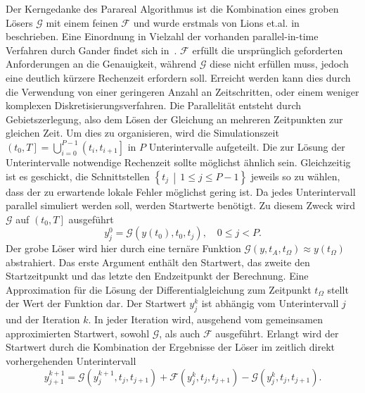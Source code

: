 Der Kerngedanke des Parareal Algorithmus ist die Kombination eines groben Lösers \(\mathcal{G}\) mit einem feinen \(\mathcal{F}\) und wurde erstmals von Lions et.al. in~\cite{Lions:2001} beschrieben. Eine Einordnung in Vielzahl der vorhanden parallel-in-time Verfahren durch Gander findet sich in~\cite{Gander:2015}. \(\mathcal{F}\) erfüllt die ursprünglich geforderten Anforderungen an die Genauigkeit, während \(\mathcal{G}\) diese nicht erfüllen muss, jedoch eine deutlich kürzere Rechenzeit erfordern soll. Erreicht werden kann dies durch die Verwendung von einer geringeren Anzahl an Zeitschritten, oder einem weniger komplexen Diskretisierungsverfahren. Die Parallelität entsteht durch Gebietszerlegung, also dem Lösen der Gleichung an mehreren Zeitpunkten zur gleichen Zeit. Um dies zu organisieren, wird die Simulationszeit \(\left(t_0, T\right] = \bigcup_{i=0}^{P-1} \left(t_i, t_{i+1}\right]\) in \(P\) Unterintervalle aufgeteilt. Die zur Lösung der Unterintervalle notwendige Rechenzeit sollte möglichst ähnlich sein. Gleichzeitig ist es geschickt, die Schnittstellen \(\left\{t_j \,\middle|\, 1 \leq j \leq P-1\right\}\) jeweils so zu wählen, dass der zu erwartende lokale Fehler möglichst gering ist. Da jedes Unterintervall parallel simuliert werden soll, werden Startwerte benötigt. Zu diesem Zweck wird \(\mathcal{G}\) auf \(\left(t_0, T\right]\) ausgeführt
\begin{displaymath}
    y_{j}^{0} = \mathcal{G}\!\left(y(t_0), t_0, t_{j}\right), \quad 0 \leq j < P.
\end{displaymath}
Der grobe Löser wird hier durch eine ternäre Funktion \(\mathcal{G}\!\left(y, t_{A}, t_{\Omega}\right) \approx y(t_\Omega)\) abstrahiert. Das erste Argument enthält den Startwert, das zweite den Startzeitpunkt und das letzte den Endzeitpunkt der Berechnung. Eine Approximation für die Lösung der Differentialgleichung zum Zeitpunkt \(t_\Omega\) stellt der Wert der Funktion dar. Der Startwert \(y_j^k\) ist abhängig vom  Unterintervall \(j\) und der Iteration \(k\). In jeder Iteration wird, ausgehend vom gemeinsamen approximierten Startwert, sowohl \(\mathcal{G}\), als auch \(\mathcal{F}\) ausgeführt. Erlangt wird der Startwert durch die Kombination der Ergebnisse der Löser im zeitlich direkt vorhergehenden Unterintervall
\begin{equation} \label{eq:1}
    y_{j+1}^{k+1} = \mathcal{G}\!\!\left(y_j^{k+1}, t_j, t_{j+1}\right) + \mathcal{F}\!\!\left(y_j^k, t_j, t_{j+1}\right) - \mathcal{G}\!\!\left(y_j^k, t_j, t_{j+1}\right).
\end{equation}
